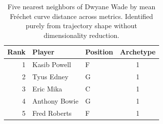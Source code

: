 \begin{table}[htbp]
  \centering\small
  \begin{tabular}{rllc}
    \toprule
    Rank & Player & Position & Archetype \\
    \midrule
    1 & Kasib Powell & F & 1 \\
    2 & Tyus Edney & G & 1 \\
    3 & Eric Mika & C & 1 \\
    4 & Anthony Bowie & G & 1 \\
    5 & Fred Roberts & F & 1 \\
    \bottomrule
  \end{tabular}
  \caption{Five nearest neighbors of Dwyane Wade by mean Fr\'{e}chet curve distance across metrics. Identified purely from trajectory shape without dimensionality reduction.}
  \label{tab:Dwyane_Wade_frechet_curve_neighbors}
\end{table}

